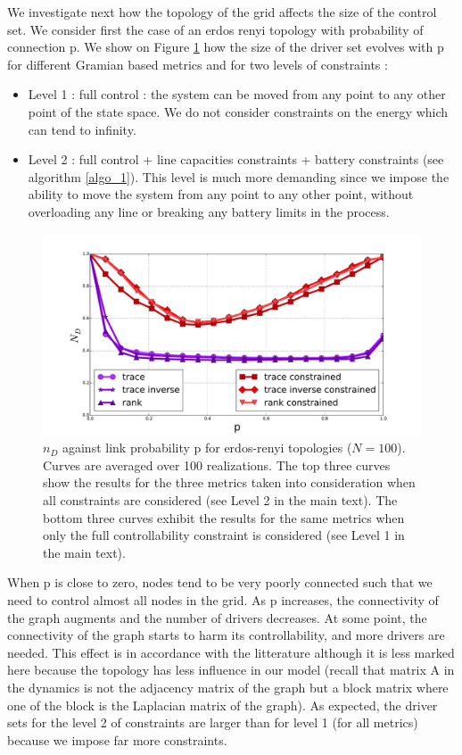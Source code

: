 \documentclass[conference]{IEEEtran}
\begin{document}
We investigate next how the topology of the grid affects the size of the control set. We consider first the case of an erdos renyi topology with probability of connection p. We show on Figure \ref{fig:erdos_renyi} how the size of the driver set evolves with p for different Gramian based metrics and for two levels of constraints : 

\begin{itemize}
\item Level 1 : full control : the system can be moved from any point to any other point of the state space. We do not consider constraints on the energy which can tend to infinity. 
\item Level 2 : full control + line capacities constraints + battery constraints (see algorithm \ref{algo_1}). This level is much more demanding since we impose the ability to move the system from any point to any other point, without overloading any line or breaking any battery limits in the process.
\end{itemize}

\begin{figure}
\includegraphics[scale=.25]{./figure_4/figure_4}
\caption{ $ n_D $ against link probability p for erdos-renyi topologies ($ N=100 $). Curves are averaged over 100 realizations. The top three curves show the results for the three metrics taken into consideration when all constraints are considered (see Level 2 in the main text). The bottom three curves exhibit the results for the same metrics when only the full controllability constraint is considered (see Level 1 in the main text).}
\label{fig:erdos_renyi}
\end{figure}


When p is close to zero, nodes tend to be very poorly connected such that we need to control almost all nodes in the grid. As p increases, the connectivity of the graph augments and the number of drivers decreases. At some point, the connectivity of the graph starts to harm its controllability, and more drivers are needed. This effect is in accordance with the litterature although it is less marked here because the topology has less influence in our model (recall that matrix A in the dynamics is not the adjacency matrix of the graph but a block matrix where one of the block is the Laplacian matrix of the graph). As expected, the driver sets for the level 2 of constraints are larger than for level 1 (for all metrics) because we impose far more constraints.
\end{document}
